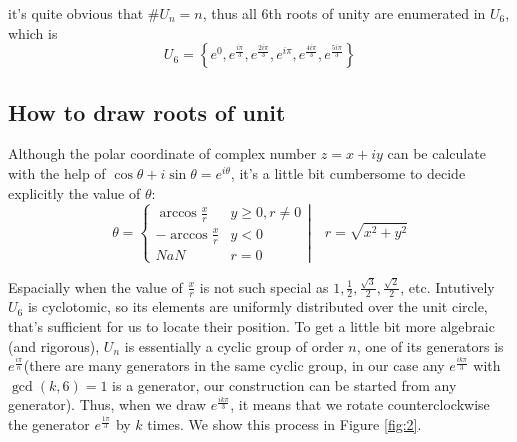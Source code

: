 \documentclass{article}
\numberwithin{equation}{section}
\begin{document}
it's quite obvious that $\#U_n = n$, thus all $6$th roots of unity are enumerated in $U_6$, which is
\begin{equation}
	U_6 = \left\{e^0, e^{\frac{i\pi}{3}} , e^{\frac{2i\pi}{3}},e^{i\pi},e^{\frac{4i\pi}{3}},e^{\frac{5i\pi}{3}}\right\}
\end{equation}

\subsection{How to draw roots of unit}
Although the polar coordinate of complex number $z = x+iy$ can be calculate with the help of $\cos\theta+i\sin\theta =e^{i\theta}$, it's a little bit cumbersome to decide explicitly the value of $\theta$:
\begin{equation}
	\theta = \left\{
	\begin{array}{lc}
		\arccos\frac{x}{r}& y\geq0, r\neq 0\\
		-\arccos\frac{x}{r}& y<0\\
		NaN& r=0
	\end{array}\right\vert \quad r = \sqrt{x^2+y^2}
\end{equation}

Espacially when the value of $\frac{x}{r}$ is not such special as $1,\frac{1}{2},\frac{\sqrt{3}}{2},\frac{\sqrt{2}}{2}$, etc. Intutively $U_6$ is cyclotomic, so its elements are uniformly distributed over the unit circle, that's sufficient for us to locate their position. To get a little bit more algebraic (and rigorous), $U_n$ is essentially a cyclic group of order $n$, one of its generators is $e^{\frac{i\pi}{n}}$(there are many generators in the same cyclic group, in our case any $e^{\frac{ik\pi}{3}}$ with $\gcd(k,6)=1$ is a generator, our construction can be started from any generator). Thus, when we draw $e^{\frac{ik\pi}{3}}$, it means that we rotate counterclockwise the generator $e^{\frac{1\pi}{3}}$ by $k$ times. We show this process in Figure \ref{fig:2}.
\end{document}
